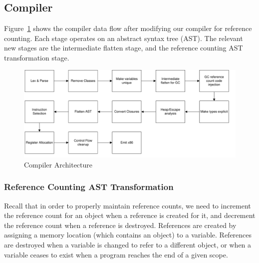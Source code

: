 \documentclass{sigplanconf}
\begin{document}
\subsection{Compiler}

Figure~\ref{fig-comparch} shows the compiler data flow after modifying our compiler for reference counting.  Each stage operates on an abstract syntax tree (AST).  The relevant new stages are the intermediate flatten stage, and the reference counting AST transformation stage.  

\begin{figure}
\begin{center}
\includegraphics[scale=0.48]{compiler_flow.pdf}
\end{center}
\caption{Compiler Architecture}
\label{fig-comparch}
\end{figure}

\subsubsection{Reference Counting AST Transformation}

Recall that in order to properly maintain reference counts, we need to increment the reference count for an object when a reference is created for it, and decrement the reference count when a reference is destroyed.  References are created by assigning a memory location (which contains an object) to a variable.  References are destroyed when a variable is changed to refer to a different object, or when a variable ceases to exist when a program reaches the end of a given scope.
\end{document}
